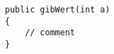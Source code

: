 \documentclass{article}
\begin{document}


\begin{lstlisting}
public gibWert(int a)
{
	// comment
}
\end{lstlisting}


\end{document}
